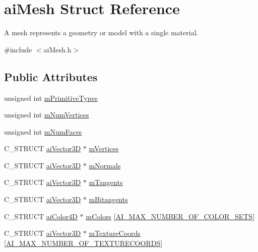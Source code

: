 \hypertarget{structai_mesh}{\section{ai\-Mesh Struct Reference}
\label{structai_mesh}
}


A mesh represents a geometry or model with a single material.  




{\ttfamily \#include $<$ai\-Mesh.\-h$>$}

\subsection*{Public Attributes}
\begin{DoxyCompactItemize}
\item 
unsigned int \hyperlink{structai_mesh_a99d66ac0a444068c1b252b30265cbf53}{m\-Primitive\-Types}
\item 
unsigned int \hyperlink{structai_mesh_ab34b7b5941e6636f1c08f615cbb072ef}{m\-Num\-Vertices}
\item 
unsigned int \hyperlink{structai_mesh_aeed22ee6963b79548f3877b3c905518e}{m\-Num\-Faces}
\item 
C\-\_\-\-S\-T\-R\-U\-C\-T \hyperlink{structai_vector3_d}{ai\-Vector3\-D} $\ast$ \hyperlink{structai_mesh_afd4588abb3e1c72821ae0234a3850662}{m\-Vertices}
\item 
C\-\_\-\-S\-T\-R\-U\-C\-T \hyperlink{structai_vector3_d}{ai\-Vector3\-D} $\ast$ \hyperlink{structai_mesh_aec81b496b4d93838cef038933dabe9b9}{m\-Normals}
\item 
C\-\_\-\-S\-T\-R\-U\-C\-T \hyperlink{structai_vector3_d}{ai\-Vector3\-D} $\ast$ \hyperlink{structai_mesh_af367ff78bd69f3e83d7edc8ad67dc5df}{m\-Tangents}
\item 
C\-\_\-\-S\-T\-R\-U\-C\-T \hyperlink{structai_vector3_d}{ai\-Vector3\-D} $\ast$ \hyperlink{structai_mesh_ab2a81bfe1731f01271ebab274a8f01c4}{m\-Bitangents}
\item 
C\-\_\-\-S\-T\-R\-U\-C\-T \hyperlink{structai_color4_d}{ai\-Color4\-D} $\ast$ \hyperlink{structai_mesh_ad9215f67bd0c2277b10775a8adb66b96}{m\-Colors} \mbox{[}\hyperlink{ai_mesh_8h_a74ea1282873ac4b111b48d2380c26bdc}{A\-I\-\_\-\-M\-A\-X\-\_\-\-N\-U\-M\-B\-E\-R\-\_\-\-O\-F\-\_\-\-C\-O\-L\-O\-R\-\_\-\-S\-E\-T\-S}\mbox{]}
\item 
C\-\_\-\-S\-T\-R\-U\-C\-T \hyperlink{structai_vector3_d}{ai\-Vector3\-D} $\ast$ \hyperlink{structai_mesh_a4a50b11d00ef50f419c75cab0f6bddd6}{m\-Texture\-Coords} \mbox{[}\hyperlink{ai_mesh_8h_a335874c5058c7f1e866eb953bf192258}{A\-I\-\_\-\-M\-A\-X\-\_\-\-N\-U\-M\-B\-E\-R\-\_\-\-O\-F\-\_\-\-T\-E\-X\-T\-U\-R\-E\-C\-O\-O\-R\-D\-S}\mbox{]}

\end{DoxyCompactItemize}
